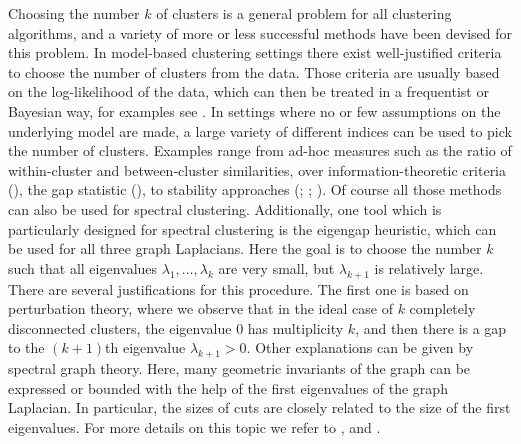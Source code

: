 \documentclass{article}
\begin{document}
Choosing the number $k$ of clusters is a general problem for all
clustering algorithms, and a variety of more or less successful
methods have been devised for this problem. In model-based clustering
settings there exist well-justified criteria to choose the number of
clusters from the data. Those criteria are usually based on the
log-likelihood of the data, which can then be treated in a frequentist
or Bayesian way, for examples see . In settings where
no or few assumptions on the underlying model are made, a large
variety of different indices can be used to pick the number of
clusters. Examples range from ad-hoc measures such as the ratio of
within-cluster and between-cluster similarities, over
information-theoretic criteria (), the gap statistic
(), to stability approaches (;
; ).  Of course all those
methods can also be used for spectral clustering. Additionally, one
tool which is particularly designed for spectral clustering is the
eigengap heuristic, which can be used for all three graph
Laplacians. Here the goal is to choose the number $k$ such that all
eigenvalues $\lambda_1, \hdots, \lambda_k$ are very small, but
$\lambda_{k+1}$ is relatively large.
%
There are several justifications for this procedure. The first one is
based on perturbation theory, where we observe that in the ideal case
of $k$ completely disconnected clusters, the eigenvalue $0$ has
multiplicity $k$, and then there is a gap to the $(k+1)$th eigenvalue
$\lambda_{k+1} > 0$.  Other explanations can be given by spectral
graph theory. Here, many geometric invariants of the graph can be
expressed or bounded with the help of the first eigenvalues of the
graph Laplacian. In particular, the sizes of cuts are closely related
to the size of the first eigenvalues. For more details on this topic
we refer to ,  and . \\
\end{document}
